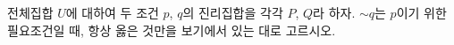 전체집합 $U$에 대하여 두 조건 $p$, $q$의 진리집합을 각각 $P$, $Q$라 하자. ${\sim}q$는 $p$이기 위한 필요조건일 때, 항상 옳은 것만을 보기에서 있는 대로 고르시오.
